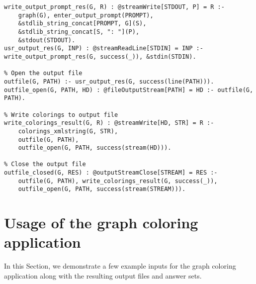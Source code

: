 \begin{lstlisting}[style=asp-code, label={lst:results-xml-graphcol-write-output}, caption={Writing Graph colorings to XML files.}]
% Prompt user for a path to which to write the calculated colorings for each graph
write_output_prompt_res(G, R) : @streamWrite[STDOUT, P] = R :- 
	graph(G), enter_output_prompt(PROMPT), 
	&stdlib_string_concat[PROMPT, G](S),
	&stdlib_string_concat[S, ": "](P),
	&stdout(STDOUT).
usr_output_res(G, INP) : @streamReadLine[STDIN] = INP :- write_output_prompt_res(G, success(_)), &stdin(STDIN).

% Open the output file
outfile(G, PATH) :- usr_output_res(G, success(line(PATH))).
outfile_open(G, PATH, HD) : @fileOutputStream[PATH] = HD :- outfile(G, PATH).

% Write colorings to output file
write_colorings_result(G, R) : @streamWrite[HD, STR] = R :- 
	colorings_xmlstring(G, STR), 
	outfile(G, PATH), 
	outfile_open(G, PATH, success(stream(HD))).

% Close the output file
outfile_closed(G, RES) : @outputStreamClose[STREAM] = RES :- 
	outfile(G, PATH), write_colorings_result(G, success(_)), 
	outfile_open(G, PATH, success(stream(STREAM))).
\end{lstlisting}

\section{Usage of the graph coloring application}

In this Section, we demonstrate a few example inputs for the graph coloring application along with the resulting output files and answer sets.

